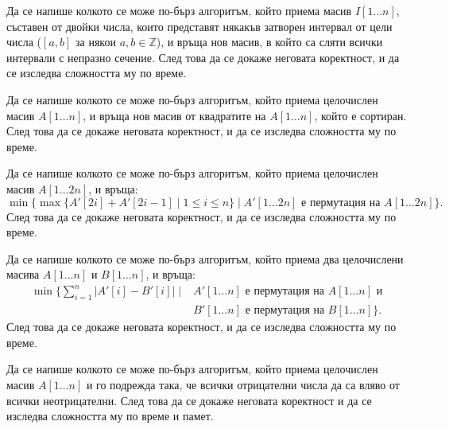 \begin{problem}
Да се напише колкото се може по-бърз алгоритъм, който приема масив $I[1 \dots n]$, съставен от двойки числа, които представят някакъв затворен интервал от цели числа ($[a, b]$ за някои $a, b \in \mathbb{Z}$), и връща нов масив, в който са сляти всички интервали с непразно сечение.
След това да се докаже неговата коректност, и да се изследва сложността му по време.
\end{problem}

\begin{problem}
Да се напише колкото се може по-бърз алгоритъм, който приема целочислен масив $A[1 \dots n]$, и връща нов масив от квадратите на $A[1 \dots n]$, който е сортиран.
След това да се докаже неговата коректност, и да се изследва сложността му по време.
\end{problem}

\begin{problem}
Да се напише колкото се може по-бърз алгоритъм, който приема целочислен масив $A[1 \dots 2n]$, и връща:
\[
    \min\{ \max \{ A'[2i] + A'[2i - 1] \mid 1 \leq i \leq n \} \mid A'[1 \dots 2n] \text{ е пермутация на } A[1 \dots 2n] \}.
\]
След това да се докаже неговата коректност, и да се изследва сложността му по време.
\end{problem}

\begin{problem}
Да се напише колкото се може по-бърз алгоритъм, който приема два целочислени масива $A[1 \dots n]$ и $B[1 \dots n]$, и връща:
\begin{align*}
    \min \{ \sum\limits_{i = 1}^n |A'[i] - B'[i]| \mid & A'[1 \dots n] \text{ е пермутация на } A[1 \dots n] \text{ и} \\
                                                       & B'[1 \dots n] \text{ е пермутация на } B[1 \dots n] \}.
\end{align*}
След това да се докаже неговата коректност, и да се изследва сложността му по време.
\end{problem}

\begin{problem}
Да се напише колкото се може по-бърз алгоритъм, който приема целочислен масив $A[1 \dots n]$ и го подрежда така, че всички отрицателни числа да са вляво от всички неотрицателни.
След това да се докаже неговата коректност и да се изследва сложността му по време и памет.
\end{problem}